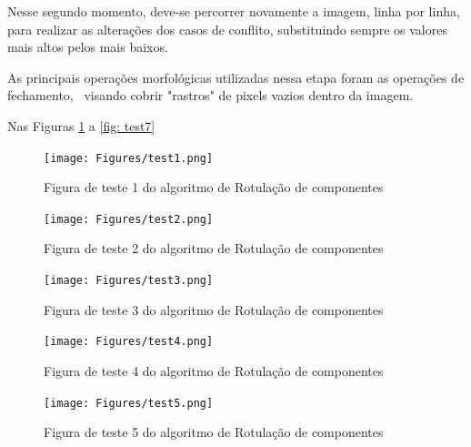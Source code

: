 \documentclass{article}
\begin{document}
Nesse segundo momento, deve-se percorrer novamente a imagem, linha por linha, para realizar as alterações dos casos de conflito, substituindo sempre os valores mais altos pelos mais baixos.

As principais operações morfológicas utilizadas nessa etapa foram as operações de fechamento,  visando cobrir "rastros" de pixels vazios dentro da imagem. 

Nas Figuras \ref{fig: test1} a \ref{fig: test7}

\begin{figure}[H]
	\label{fig: test1}
	\begin{minipage}[b]{1.0\linewidth}
		\centering
		\centerline{\texttt{[image: Figures/test1.png]}}
		\vspace{-2.0cm}
		\centerline{Figura de teste 1 do algoritmo de Rotulação de componentes}\medskip	
	\end{minipage}
\end{figure}

\begin{figure}[H]
	\label{fig: test2}
	\begin{minipage}[b]{1.0\linewidth}
		\centering
		\centerline{\texttt{[image: Figures/test2.png]}}
		\vspace{-2.0cm}
		\centerline{Figura de teste 2 do algoritmo de Rotulação de componentes}\medskip	
	\end{minipage}
\end{figure}

\begin{figure}[H]
	\label{fig: test3}
	\begin{minipage}[b]{1.0\linewidth}
		\centering
		\centerline{\texttt{[image: Figures/test3.png]}}
		\vspace{-2.0cm}
		\centerline{Figura de teste 3 do algoritmo de Rotulação de componentes}\medskip	
	\end{minipage}
\end{figure}

\begin{figure}[H]
	\label{fig: test4}
	\begin{minipage}[b]{1.0\linewidth}
		\centering
		\centerline{\texttt{[image: Figures/test4.png]}}
		\vspace{-2.0cm}
		\centerline{Figura de teste 4 do algoritmo de Rotulação de componentes}\medskip	
	\end{minipage}
\end{figure}

\begin{figure}[H]
	\label{fig: test5}
	\begin{minipage}[b]{1.0\linewidth}
		\centering
		\centerline{\texttt{[image: Figures/test5.png]}}
		\vspace{-2.0cm}
		\centerline{Figura de teste 5 do algoritmo de Rotulação de componentes}\medskip	
	\end{minipage}
\end{figure}
\end{document}
